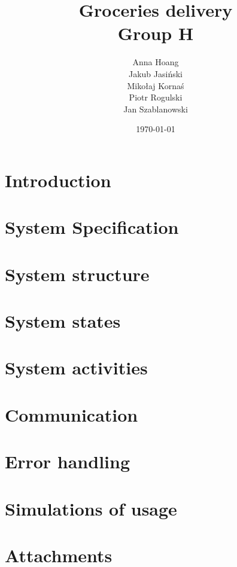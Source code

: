 \documentclass[english]{article}
\title{\textbf{Groceries delivery} \\
\large{Group H}}
\author{
  Anna Hoang \\
  Jakub Jasiński \\
  Mikołaj Kornaś \\
  Piotr Rogulski \\
  Jan Szablanowski
}
\date{\today}
\begin{document}
\maketitle

\tableofcontents

\newpage
\section{Introduction}


\newpage
\section{System Specification}


\newpage
\section{System structure}


\newpage
\section{System states}


\newpage
\section{System activities}



\newpage
\section{Communication}

\newpage


\newpage
\section{Error handling}


\newpage
\section{Simulations of usage}


\section{Attachments}
\end{document}
